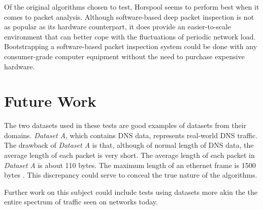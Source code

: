 \documentclass[9pt, conference]{IEEEtran}
\begin{document}
Of the original algorithms chosen to test, Horspool \citep{horspool1980} seems to perform best when it comes to packet analysis.
Although software-based deep packet inspection is not as popular as its hardware counterpart, it does provide an easier-to-scale environment that can better cope with the fluctuations of periodic network load. Bootstrapping a software-based packet inspection system could be done with any consumer-grade computer equipment without the need to purchase expensive hardware.

\section{Future Work}

The two datasets used in these tests are good examples of datasets from their domains. \textit{Dataset A}, which contains DNS data, represents real-world DNS traffic. The drawback of \textit{Dataset A} is that, although of normal length of DNS data, the average length of each packet is very short. The average length of each packet in \textit{Dataset A} is about 110 bytes. The maximum length of an ethernet frame is 1500 bytes \citep{law2012}. This discrepancy could serve to conceal the true nature of the algorithms.

Further work on this subject could include tests using datasets more akin the the entire spectrum of traffic seen on networks today. 



\end{document}
